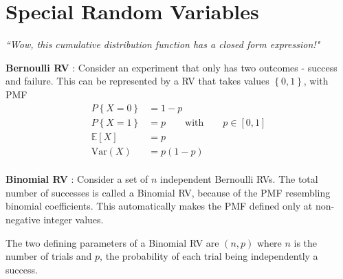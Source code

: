 \chapter{Special Random Variables}


\begin{flushright}
	\textit{``Wow, this cumulative distribution function has a closed form expression!"} \\
\end{flushright}

\textbf{Bernoulli RV} : Consider an experiment that only has two outcomes - success and failure. This can be represented by a RV that takes values $ \left\{0, 1\right\} $, with PMF  \\

\begin{align}
	P \left\{X = 0\right\} &= 1-p \nonumber \\[1ex]
	P \left\{X = 1\right\} &= p \qquad \text{with} \qquad p \in [0, 1] \\[1ex]
	\mathbb{E}[X] &= p \\[1ex]
	\mathrm{Var}(X) &= p(1-p)
\end{align} \\

\textbf{Binomial RV} : Consider a set of $ n $ independent Bernoulli RVs. The total number of successes is called a Binomial RV, because of the PMF resembling binomial coefficients. This automatically makes the PMF defined only at non-negative integer values.\\

\begin{figure}[!h]
	\centering
\end{figure}


The two defining parameters of a Binomial RV are $ (n, p) $ where $ n $ is the number of trials and $ p $, the probability of each trial being independently a success.\\

